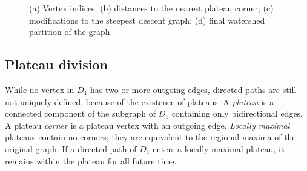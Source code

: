 \documentclass{article}
\begin{document}
\begin{figure}

  \protect\caption{(a) Vertex indices; (b) distances to the nearest
    plateau corner; (c) modifications to the steepest descent graph;
    (d) final watershed partition of the graph}
\end{figure}

\subsection{Plateau division}
While no vertex in $D_1$ has two or more outgoing edges, directed
paths are still not uniquely defined, because of the existence of
plateaus.  A \emph{plateau} is a connected component of the subgraph
of $D_1$ containing only bidirectional edges.  A plateau \emph{corner}
is a plateau vertex with an outgoing edge.
\emph{Locally maximal} plateaus contain no corners; they are
equivalent to the regional maxima of the original graph.  If a
directed path of $D_1$ enters a locally maximal plateau, it remains
within the plateau for all future time.
\end{document}
